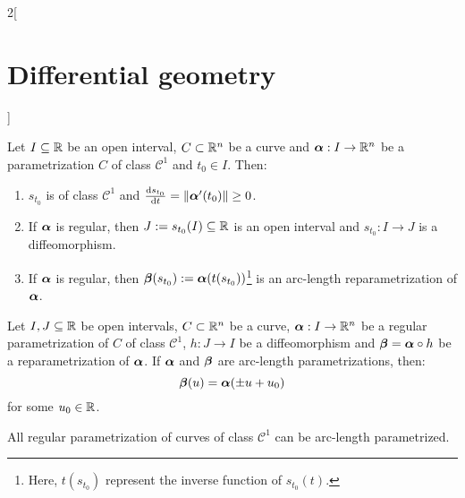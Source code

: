 \documentclass[../../../main_math.tex]{subfiles}
\begin{document}
\begin{multicols}{2}[\section{Differential geometry}]
\begin{definition}
  \end{definition}
  \begin{proposition}
    Let $I\subseteq\mathbb{R}$ be an open interval, $C\subset\mathbb{R}^n$ be a curve and $\boldsymbol{\mathrm{\alpha}}:I\rightarrow\mathbb{R}^n$ be a parametrization $C$ of class $\mathcal{C}^1$ and ${t_0}\in I$. Then:
    \begin{enumerate}
      \item $s_{t_0}$ is of class $\mathcal{C}^1$ and $\dv{s_{t_0}}{t}(t_0)=\|\boldsymbol{\mathrm{\alpha}}'(t_0)\|\geq 0$.
      \item If $\boldsymbol{\mathrm{\alpha}}$ is regular, then $J:=s_{t_0}(I)\subseteq\mathbb{R}$ is an open interval and $s_{t_0}:I\rightarrow J$ is a diffeomorphism.
      \item If $\boldsymbol{\mathrm{\alpha}}$ is regular, then $\boldsymbol{\mathrm{\beta}}(s_{t_0}):=\boldsymbol{\mathrm{\alpha}}(t(s_{t_0}))$\footnote{Here, $t(s_{t_0})$ represent the inverse function of $s_{t_0}(t)$.} is an arc-length reparametrization of $\boldsymbol{\mathrm{\alpha}}$.
    \end{enumerate}
  \end{proposition}
  \begin{proposition}
    Let $I,J\subseteq\mathbb{R}$ be open intervals, $C\subset\mathbb{R}^n$ be a curve, $\boldsymbol{\mathrm{\alpha}}:I\rightarrow\mathbb{R}^n$ be a regular parametrization of $C$ of class $\mathcal{C}^1$, $h:J\rightarrow I$ be a diffeomorphism and $\boldsymbol{\mathrm{\beta}}=\boldsymbol{\mathrm{\alpha}}\circ h$ be a reparametrization of $\boldsymbol{\mathrm{\alpha}}$. If $\boldsymbol{\mathrm{\alpha}}$ and $\boldsymbol{\mathrm{\beta}}$ are arc-length parametrizations, then: $$\boldsymbol{\mathrm{\beta}}(u)=\boldsymbol{\mathrm{\alpha}}(\pm u+u_0)$$ for some $u_0\in\mathbb{R}$.
  \end{proposition}
  \begin{proposition}
    All regular parametrization of curves of class $\mathcal{C}^1$ can be arc-length parametrized.
  \end{proposition}

\end{multicols}
\end{document}
